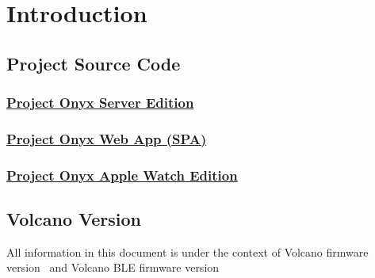 \chapter{Introduction}
\section{Project Source Code}
    \subsection{\href{https://github.com/ImACoderImACoderImACoder/ProjectOnyxServerEdition}{Project Onyx Server Edition}}
    \subsection{\href{https://github.com/ImACoderImACoderImACoder/onyx}{Project Onyx Web App (SPA)}}
    \subsection{\href{https://github.com/ImACoderImACoderImACoder/ProjectOnyxAppleWatchFiles}{Project Onyx Apple Watch Edition}}

\section{Volcano Version}
All information in this document is under the context of Volcano firmware version \volcanoFirmwareVersion\ and Volcano BLE firmware version \volcanoBleFirmwareVersion\